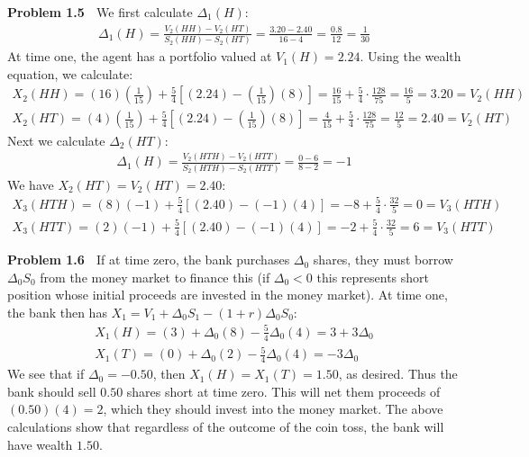 \documentclass[12pt, letterpaper]{article}
\begin{document}
\vspace{5mm}
\noindent
\textbf{Problem 1.5} $\;$ We first calculate $\Delta_1(H)$:
\begin{align*}
    \Delta_1(H) = \frac{V_2(HH)- V_2(HT)}{S_2(HH)-S_2(HT)} = \frac{3.20 - 2.40}{16-4} = \frac{0.8}{12} = \frac{1}{30}
\end{align*}
At time one, the agent has a portfolio valued at $V_1(H)=2.24$.
Using the wealth equation, we calculate:
\begin{gather*}
    X_{2}(HH) = (16)\left(\tfrac{1}{15}\right) + \tfrac{5}{4}\left[ (2.24) - \left(\tfrac{1}{15}\right)(8) \right] = \tfrac{16}{15} + \tfrac{5}{4}\cdot\tfrac{128}{75} = \tfrac{16}{5} = 3.20 = V_2(HH)\\
    X_{2}(HT) = (4)\left(\tfrac{1}{15}\right) + \tfrac{5}{4}\left[ (2.24) - \left(\tfrac{1}{15}\right)(8) \right] = \tfrac{4}{15} + \tfrac{5}{4}\cdot\tfrac{128}{75} = \tfrac{12}{5} = 2.40 = V_2(HT)
\end{gather*}
Next we calculate $\Delta_2(HT)$:
\begin{align*}
    \Delta_1(H) = \frac{V_2(HTH)- V_2(HTT)}{S_2(HTH)-S_2(HTT)} = \frac{0-6}{8-2} = -1
\end{align*}
We have $X_2(HT)=V_2(HT)=2.40$:
\begin{gather*}
    X_{3}(HTH) = (8)(-1) + \tfrac{5}{4}\left[ (2.40) - (-1)(4) \right] = - 8 + \tfrac{5}{4}\cdot \tfrac{32}{5} = 0 = V_3(HTH) \\
    X_{3}(HTT) = (2)(-1) + \tfrac{5}{4}\left[ (2.40) - (-1)(4) \right] = - 2 + \tfrac{5}{4}\cdot \tfrac{32}{5} = 6 = V_3(HTT)
\end{gather*}

\rightline{$\square$}

\vspace{5mm}
\noindent
\textbf{Problem 1.6} $\;$ If at time zero, the bank purchases $\Delta_0$ shares, they must borrow $\Delta_0 S_0$ from the money market to finance this (if $\Delta_0<0$ this represents short position whose initial proceeds are invested in the money market).
At time one, the bank then has $X_1 = V_1 + \Delta_0 S_1 - (1+r)\Delta_0 S_0$:
\begin{gather*}
    X_1(H) = (3) + \Delta_0 (8) - \tfrac{5}{4}\Delta_0 (4) = 3 + 3\Delta_0 \\
    X_1(T) = (0) + \Delta_0 (2) - \tfrac{5}{4}\Delta_0 (4) = -3 \Delta_0
\end{gather*}
We see that if $\Delta_0 = -0.50$, then $X_1(H) = X_1(T) = 1.50 $, as desired.
Thus the bank should sell $0.50$ shares short at time zero.
This will net them proceeds of $(0.50)(4) = 2$, which they should invest into the money market.
The above calculations show that regardless of the outcome of the coin toss, the bank will have wealth $1.50$.
\end{document}
